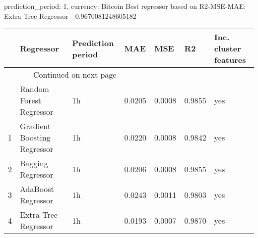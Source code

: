 
prediction_period: 1, currency: Bitcoin
Best regressor based on R2-MSE-MAE: Extra Tree Regressor - 0.9670081248605182
\begin{longtable}{lllllll}
\toprule
{} &                    Regressor & Prediction period &     MAE &     MSE &      R2 & Inc. cluster features \\
\midrule
\endhead
\midrule
\multicolumn{3}{r}{{Continued on next page}} \\
\midrule
\endfoot

\bottomrule
\endlastfoot
0 &      Random Forest Regressor &                1h &  0.0205 &  0.0008 &  0.9855 &                   yes \\
1 &  Gradient Boosting Regressor &                1h &  0.0220 &  0.0008 &  0.9842 &                   yes \\
2 &            Bagging Regressor &                1h &  0.0206 &  0.0008 &  0.9855 &                   yes \\
3 &           AdaBoost Regressor &                1h &  0.0243 &  0.0011 &  0.9803 &                   yes \\
4 &         Extra Tree Regressor &                1h &  0.0193 &  0.0007 &  0.9870 &                   yes \\
\end{longtable}

